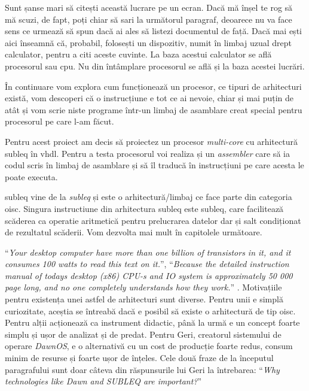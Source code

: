 \documentclass[../main.tex]{subfiles}
\begin{document}
Sunt șanse mari să citești această lucrare pe un ecran. Dacă mă înșel te rog să mă scuzi, 
de fapt, poți chiar să sari la următorul paragraf, deoarece nu va face sens ce urmează să spun
dacă ai ales să listezi documentul de față. Dacă mai ești aici înseamnă că, probabil, folosești un dispozitiv,
numit în limbaj uzual drept calculator, pentru a citi aceste cuvinte. La baza acestui calculator
se află procesorul sau \acrshort{cpu}. Nu din întâmplare procesorul se află și la baza acestei
lucrări. 

În continuare vom explora cum funcționează un procesor, ce tipuri de arhitecturi există,
vom descoperi că o instrucțiune e tot ce ai nevoie, chiar și mai puțin de atât și vom scrie
niste programe într-un limbaj de asamblare creat special pentru procesorul pe care l-am făcut.

Pentru acest proiect am decis să proiectez un procesor \emph{multi-core} cu arhitectură
\acrshort{subleq}\cite{subleq} în \acrshort{vhdl}. Pentru a testa procesorul voi realiza și un \emph{assembler}
care să ia codul scris în limbaj de asamblare și să îl traducă în instrucțiuni pe care
acesta le poate executa.

\acrshort{subleq}\cite{subleq} vine de la \emph{\acrlong{subleq}} și este o arhitectură/limbaj ce face parte
din categoria \acrfull{oisc}. Singura instructiune din arhitectura \acrshort{subleq} este subleq,
care facilitează scăderea ca operatie aritmetică pentru prelucrarea datelor dar și salt condiționat
de rezultatul scăderii. Vom dezvolta mai mult în capitolele următoare.

``\emph{Your desktop computer have more than one billion of transistors in it, and it consumes 100 watts to read this text on it.}'',
``\emph{Because the detailed instruction manual of todays desktop (x86) CPU-s and IO system is approximately 50 000 page long, and no one completely understands how they work.}''
\cite{dawn}. Motivațiile pentru existența unei astfel de arhitecturi sunt diverse. Pentru unii e simplă curiozitate,
aceștia se întreabă dacă e posibil să existe o arhitectură de tip \acrshort{oisc}. Pentru alții acționează ca
instrument didactic, până la urmă e un concept foarte simplu și ușor de analizat și de predat. Pentru Geri,
creatorul sistemului de operare \emph{DawnOS}\cite{dawn}, e o alternativă cu un cost de producție foarte redus,
consum minim de resurse și foarte ușor de înțeles. Cele două fraze de la începutul paragrafului sunt doar câteva
din răspunsurile lui Geri la întrebarea: ``\emph{Why technologies like Dawn and SUBLEQ are important?}''
\end{document}
